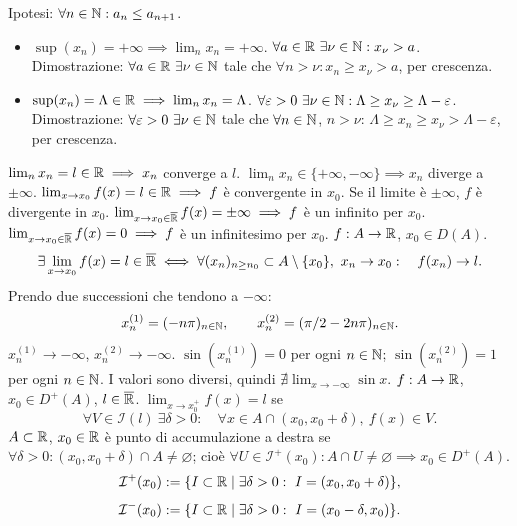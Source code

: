 Ipotesi: $\forall n\in\mathbb N:a_n\le a_{n+1}$.
\begin{itemize}\item $\sup(x_n)=+\infty\implies\lim_nx_n=+\infty$.
$\forall a\in\R\ \exists\nu\in\N:x_\nu>a$.
Dimostrazione: $\forall a\in\mathbb R\ \exists\nu\in\mathbb N$ tale che $\forall n>\nu:x_n\ge x_\nu>a$, per crescenza.
\item $\sup(x_n)=\Lambda\in\mathbb R\implies\lim_nx_n=\Lambda$.
$\forall\varepsilon>0\ \exists\nu\in\N:\Lambda\ge x_\nu\ge\Lambda-\varepsilon$.
Dimostrazione: $\forall\varepsilon>0\ \exists\nu\in\N$ tale che $\forall n\in\mathbb N$, $n>\nu$:
$\Lambda\ge x_n\ge x_\nu>\Lambda-\varepsilon$, per crescenza.
\end{itemize}
$\lim_nx_n=l\in\mathbb R\implies x_n$ converge a $l$.
$\lim_nx_n\in\{+\infty,-\infty\}\implies x_n$ diverge a $\pm\infty$.
$\lim_{x\to x_0}f(x)=l\in\mathbb R\implies f$ è convergente in $x_0$.
Se il limite è $\pm\infty$, $f$ è divergente in $x_0$.
$\lim_{x\to x_0\in\overline{\mathbb R}}f(x)=\pm\infty\implies f$ è un infinito per $x_0$.
$\lim_{x\to x_0\in\overline{\mathbb R}}f(x)=0\implies f$ è un infinitesimo per $x_0$.
$f:A\to\mathbb R$, $x_0\in D(A)$.
\[\exists\lim_{x\to x_0}f(x)=l\in\overline{\mathbb R}\iff
\forall(x_n)_{n\ge n_0}\subset A\setminus\{x_0\},\ x_n\to x_0:\quad f(x_n)\to l.\]
Prendo due successioni che tendono a $-\infty$:
\[x_n^{(1)}=(-n\pi)_{n\in\mathbb N},\qquad x_n^{(2)}=(\pi/2-2n\pi)_{n\in\mathbb N}.\]
$x_n^{(1)}\to-\infty$, $x_n^{(2)}\to-\infty$.
$\sin(x_n^{(1)})=0$ per ogni $n\in\mathbb N$; $\sin(x_n^{(2)})=1$ per ogni $n\in\mathbb N$.
I valori sono diversi, quindi $\nexists\lim_{x\to-\infty}\sin x$.
$f:A\to\mathbb R$, $x_0\in D^+(A)$, $l\in\overline{\mathbb R}$.
$\lim_{x\to x_0^+}f(x)=l$ se
\[\forall V\in\mathcal I(l)\ \exists\delta>0:\quad\forall x\in A\cap(x_0,x_0+\delta),\ f(x)\in V.\]
$A\subset\mathbb R$, $x_0\in\mathbb R$ è punto di accumulazione a destra se
$\forall\delta>0:(x_0,x_0+\delta)\cap A\ne\varnothing$;
cioè $\forall U\in\mathcal I^+(x_0):A\cap U\ne\varnothing\implies x_0\in D^+(A)$.
\[\mathcal I^+(x_0):=\{I\subset\R\mid\exists\delta>0:\ I=(x_0,x_0+\delta)\},\]
\[\mathcal I^-(x_0):=\{I\subset\R\mid\exists\delta>0:\ I=(x_0-\delta,x_0)\}.\]
